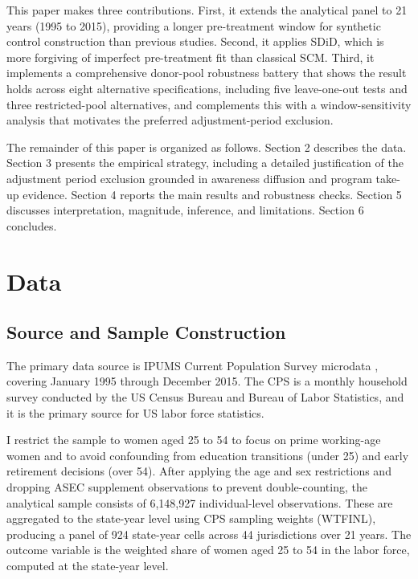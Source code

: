 \documentclass[12pt, letterpaper]{article}
\begin{document}
This paper makes three contributions. First, it extends the analytical panel to 21 years (1995 to 2015), providing a longer pre-treatment window for synthetic control construction than previous studies. Second, it applies SDiD, which is more forgiving of imperfect pre-treatment fit than classical SCM. Third, it implements a comprehensive donor-pool robustness battery that shows the result holds across eight alternative specifications, including five leave-one-out tests and three restricted-pool alternatives, and complements this with a window-sensitivity analysis that motivates the preferred adjustment-period exclusion.

The remainder of this paper is organized as follows. Section 2 describes the data. Section 3 presents the empirical strategy, including a detailed justification of the adjustment period exclusion grounded in awareness diffusion and program take-up evidence. Section 4 reports the main results and robustness checks. Section 5 discusses interpretation, magnitude, inference, and limitations. Section 6 concludes.

\section{Data}

\subsection{Source and Sample Construction}

The primary data source is IPUMS Current Population Survey microdata \citep{flood2022}, covering January 1995 through December 2015. The CPS is a monthly household survey conducted by the US Census Bureau and Bureau of Labor Statistics, and it is the primary source for US labor force statistics.

I restrict the sample to women aged 25 to 54 to focus on prime working-age women and to avoid confounding from education transitions (under 25) and early retirement decisions (over 54). After applying the age and sex restrictions and dropping ASEC supplement observations to prevent double-counting, the analytical sample consists of 6,148,927 individual-level observations. These are aggregated to the state-year level using CPS sampling weights (WTFINL), producing a panel of 924 state-year cells across 44 jurisdictions over 21 years. The outcome variable is the weighted share of women aged 25 to 54 in the labor force, computed at the state-year level.
\end{document}
